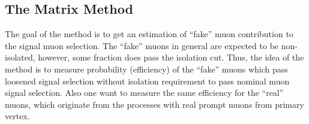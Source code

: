 % 

\subsection{The Matrix Method}
\label{subsec:matrix_method}
The goal of the method is to get an estimation of ``fake'' muon contribution to the signal muon selection.
The ``fake'' muons in general are expected to be non-isolated, however, some fraction does pass the isolation cut. 
Thus, the idea of the method is to measure probability (efficiency) of the ``fake'' muons
which pass loosened signal selection without isolation requirement to pass nominal muon signal selection.
Also one want to measure the same efficiency for the ``real'' muons, which originate from the processes with real prompt muons from primary vertex.

